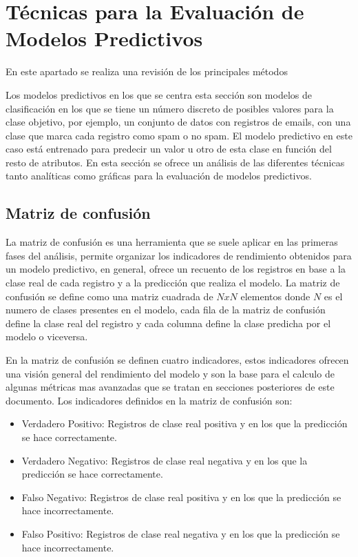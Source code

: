 \section{Técnicas para la Evaluación de Modelos Predictivos}


En este apartado se realiza una revisión de los principales métodos


Los modelos predictivos en los que se centra esta sección son modelos de clasificación en los que se tiene un número discreto de posibles valores para la clase objetivo, por ejemplo, un conjunto de datos con registros de emails, con una clase que marca cada registro como spam o no spam. El modelo predictivo en este caso está entrenado para predecir un valor u otro de esta clase en función del resto de atributos. En esta sección se ofrece un análisis de las diferentes técnicas tanto analíticas como gráficas para la evaluación de modelos predictivos.

\subsection{Matriz de confusión}

La matriz de confusión es una herramienta que se suele aplicar en las primeras fases del análisis, permite organizar los indicadores de rendimiento obtenidos para un modelo predictivo, en general, ofrece un recuento de los registros en base a la clase real de cada registro y a la predicción que realiza el modelo. La matriz de confusión se define como una matriz cuadrada de $NxN$ elementos donde $N$ es el numero de clases presentes en el modelo, cada fila de la matriz de confusión define la clase real del registro y cada columna define la clase predicha por el modelo o viceversa.

\bigbreak

En la matriz de confusión se definen cuatro indicadores, estos indicadores ofrecen una visión general del rendimiento del modelo y son la base para el calculo de algunas métricas mas avanzadas que se tratan en secciones posteriores de este documento. Los indicadores definidos en la matriz de confusión son:

\begin{itemize}
    \item Verdadero Positivo: Registros de clase real positiva y en los que la predicción se hace correctamente.
    \item Verdadero Negativo: Registros de clase real negativa y en los que la predicción se hace correctamente.
    \item Falso Negativo: Registros de clase real positiva y en los que la predicción se hace incorrectamente.
    \item Falso Positivo: Registros de clase real negativa y en los que la predicción se hace incorrectamente.
\end{itemize}

